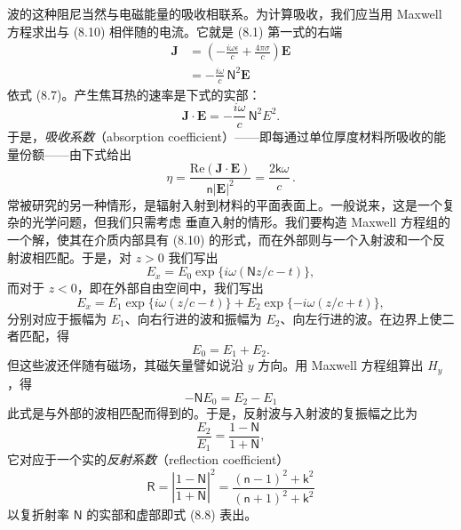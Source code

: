 波的这种阻尼当然与电磁能量的吸收相联系。为计算吸收，我们应当用 Maxwell 方程求出与 (8.10) 相伴随的电流。它就是 (8.1) 第一式的右端
\begin{equation*}
\begin{aligned}
\mathbf{J} &= \left(-\frac{i\omega\epsilon}{c} + \frac{4\pi\sigma}{c}\right)\mathbf{E}\\
&= -\frac{i\omega}{c}\,\mathsf{N}^2\mathbf{E}
\end{aligned}\tag{8.11}
\end{equation*}
依式 (8.7)。产生焦耳热的速率是下式的实部：
\begin{equation*}
\mathbf{J}\cdot\mathbf{E} = -\frac{i\omega}{c}\,\mathsf{N}^2 E^2.\tag{8.12}
\end{equation*}
于是，\emph{吸收系数}（absorption coefficient）——即每通过单位厚度材料所吸收的能量份额——由下式给出
\begin{equation*}
\eta = \frac{\mathrm{Re}(\mathbf{J}\cdot\mathbf{E})}{\mathsf{n}|\mathbf{E}|^2} = \frac{2\mathsf{k}\omega}{c}\,.\tag{8.13}
\end{equation*}
常被研究的另一种情形，是辐射入射到材料的平面表面上。一般说来，这是一个复杂的光学问题，但我们只需考虑
垂直入射的情形。我们要构造 Maxwell 方程组的一个解，使其在介质内部具有 (8.10) 的形式，而在外部则与一个入射波和一个反射波相匹配。于是，对 $z > 0$ 我们写出
\begin{equation*}
E_x = E_0\exp\{i\omega(\mathsf{N}z/c - t)\},\tag{8.14}
\end{equation*}
而对于 $z < 0$，即在外部自由空间中，我们写出
\begin{equation*}
E_x = E_1\exp\{i\omega(z/c - t)\} + E_2\exp\{-i\omega(z/c + t)\},\tag{8.15}
\end{equation*}
分别对应于振幅为 $E_1$、向右行进的波和振幅为 $E_2$、向左行进的波。在边界上使二者匹配，得
\begin{equation*}
E_0 = E_1 + E_2.\tag{8.16}
\end{equation*}
但这些波还伴随有磁场，其磁矢量譬如说沿 $y$ 方向。用 Maxwell 方程组算出 $H_y$，得
\begin{equation*}
-\mathsf{N}E_0 = E_2 - E_1\tag{8.17}
\end{equation*}
此式是与外部的波相匹配而得到的。于是，反射波与入射波的复振幅之比为
\begin{equation*}
\frac{E_2}{E_1} = \frac{1-\mathsf{N}}{1+\mathsf{N}},\tag{8.18}
\end{equation*}
它对应于一个实的\emph{反射系数}（reflection coefficient）
\begin{equation*}
\mathsf{R} = \left|\frac{1-\mathsf{N}}{1+\mathsf{N}}\right|^2 = \frac{(\mathsf{n}-1)^2+\mathsf{k}^2}{(\mathsf{n}+1)^2+\mathsf{k}^2}\tag{8.19}
\end{equation*}
以复折射率 $\mathsf{N}$ 的实部和虚部即式 (8.8) 表出。


